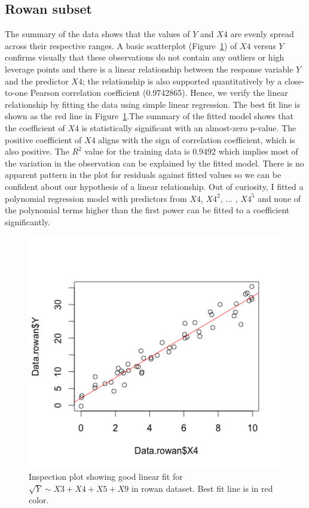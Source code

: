 \documentclass{article}
\begin{document}
\subsection{Rowan subset}

The summary of the data shows that the values of $Y$ and $X4$ are evenly spread across their respective ranges. A basic scatterplot (Figure~\ref{fig:10-rowan}) of $X4$ versus $Y$ confirms visually that these observations do not contain any outliers or high leverage points and there is a linear relationship between the response variable $Y$ and the predictor $X4$; the relationship is also supported quantitatively by a close-to-one Pearson correlation coefficient (0.9742865). Hence, we verify the linear relationship by fitting the data using simple linear regression. The best fit line is shown as the red line in Figure~\ref{fig:10-rowan}.The summary of the fitted model shows that the coefficient of $X4$ is statistically significant with an almost-zero p-value. The positive coefficient of $X4$ aligns with the sign of correlation coefficient, which is also positive. The $R^2$ value for the training data is 0.9492 which implies most of the variation in the observation can be explained by the fitted model. There is no apparent pattern in the plot for residuals against fitted values so we can be confident about our hypothesis of a linear relationship. Out of curiosity, I fitted a polynomial regression model with predictors from $X4$, $X4^2$, \(...\) , $X4^5$ and none of the polynomial terms higher than the first power can be fitted to a coefficient significantly.

\begin{figure}[h!]
  \includegraphics[width=\linewidth]{project/images/10-rowan.png}
  \caption{Inspection plot showing good linear fit for $\sqrt{Y} \sim X3+X4+X5+X9$ in rowan dataset. Best fit line is in red color.}
  \label{fig:10-rowan}
\end{figure}
\end{document}
